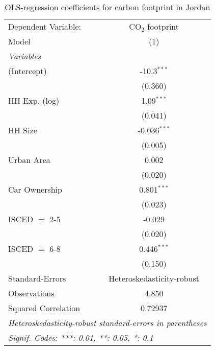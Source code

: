 
\begin{table}[htbp!]
   \centering
   \small
   \begin{adjustbox}{width = 1\textwidth, max height = 0.95\textheight, center}
      \begin{threeparttable}[b]
         \caption{\label{tab:OLS_2_JOR} OLS-regression coefficients for carbon footprint in Jordan}
         \begin{tabular}{lc}
            \tabularnewline \midrule \midrule
            Dependent Variable: & CO$_{2}$ footprint\\  
            Model               & (1)\\  
            \midrule
            \emph{Variables}\\
            (Intercept)         & -10.3$^{***}$\\   
                                & (0.360)\\   
            HH Exp. (log)       & 1.09$^{***}$\\   
                                & (0.041)\\   
            HH Size             & -0.036$^{***}$\\   
                                & (0.005)\\   
            Urban Area          & 0.002\\   
                                & (0.020)\\   
            Car Ownership       & 0.801$^{***}$\\   
                                & (0.023)\\   
            ISCED $=$ 2-5       & -0.029\\   
                                & (0.020)\\   
            ISCED $=$ 6-8       & 0.446$^{***}$\\   
                                & (0.150)\\   
            \midrule 
            Standard-Errors     & Heteroskedasticity-robust \\   
            Observations        & 4,850\\  
            Squared Correlation & 0.72937\\  
            \midrule \midrule
            \multicolumn{2}{l}{\emph{Heteroskedasticity-robust standard-errors in parentheses}}\\
            \multicolumn{2}{l}{\emph{Signif. Codes: ***: 0.01, **: 0.05, *: 0.1}}\\
         \end{tabular}
         

\end{threeparttable}
\end{adjustbox}
\end{table}
